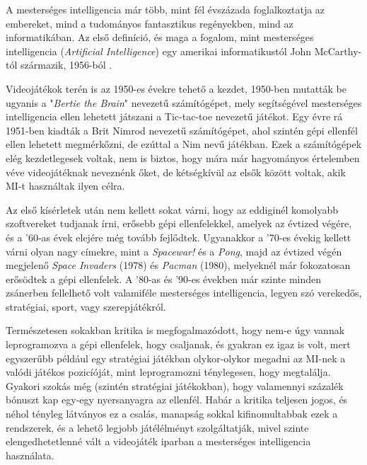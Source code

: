 

A mesterséges intelligencia már több, mint fél évszázada foglalkoztatja az embereket, mind a tudományos fantasztikus regényekben, mind az informatikában. Az első definíció, és maga a fogalom, mint mesterséges intelligencia (\textit{Artificial Intelligence}) egy amerikai informatikustól John McCarthy-tól származik, 1956-ból {\cite{ai}}.

Videojátékok terén is az 1950-es évekre tehető a kezdet, 1950-ben mutatták be ugyanis a "\textit{Bertie the Brain}" nevezetű számítógépet, mely segítségével mesterséges intelligencia ellen lehetett játszani a Tic-tac-toe nevezetű játékot. Egy évre rá 1951-ben kiadták a Brit Nimrod nevezetű számítógépet, ahol szintén gépi ellenfél ellen lehetett megmérkőzni, de ezúttal a Nim nevű játékban.
Ezek a számítógépek elég kezdetlegesek voltak, nem is biztos, hogy mára már hagyományos értelemben véve videojátéknak neveznénk őket, de kétségkívül az elsők között voltak, akik MI-t használtak ilyen célra.

Az első kísérletek után nem kellett sokat várni, hogy az eddiginél komolyabb szoftvereket tudjanak írni, erősebb gépi ellenfelekkel, amelyek az évtized végére, és a '60-as évek elejére még tovább fejlődtek. Ugyanakkor a '70-es évekig kellett várni olyan nagy címekre, mint a \textit{Spacewar!} és a \textit{Pong}, majd az évtized végén megjelenő \textit{ Space Invaders} (1978) és \textit{Pacman} (1980), melyeknél már fokozatosan erősödtek a gépi ellenfelek.
A '80-as és '90-es években már szinte minden zsánerben fellelhető volt valamiféle mesterséges intelligencia, legyen szó verekedős, stratégiai, sport, vagy szerepjátékról.

Természetesen sokakban kritika is megfogalmazódott, hogy nem-e úgy vannak leprogramozva a gépi ellenfelek, hogy csaljanak, és gyakran ez igaz is volt, mert egyszerűbb például egy stratégiai játékban olykor-olykor megadni az MI-nek a valódi játékos pozicíóját, mint leprogramozni ténylegesen, hogy megtalálja. Gyakori szokás még (szintén stratégiai játékokban), hogy valamennyi százalék bónuszt kap egy-egy nyersanyagra az ellenfél. Habár a kritika teljesen jogos, és néhol tényleg látványos ez a csalás, manapság sokkal kifinomultabbak ezek a rendszerek, és a lehető legjobb játélélményt szolgáltatják, mivel szinte elengedhetetlenné vált a videojáték iparban a mesterséges intelligencia használata.

